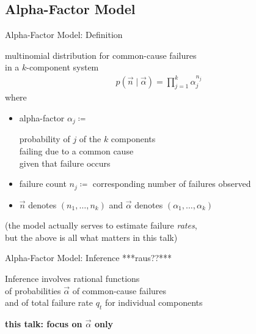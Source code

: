 \documentclass{beamer}
\begin{document}
\subsection{Alpha-Factor Model}

\begin{frame}{Alpha-Factor Model: Definition}
  \begin{definition} %
    multinomial distribution for common-cause failures \\
    in a $k$-component system\vspace*{-2ex}
    \begin{align*}
      p(\vec{n}\mid\vec{\alpha})=\prod_{j=1}^k\alpha_j^{n_j}
    \end{align*}\vspace*{-0.5ex}
    where
    \begin{itemize}
    \item \alert{alpha-factor}
      $\alpha_j\coloneqq$
      \parbox[t]{0.6\textwidth}{%
        probability of $j$ of the $k$ components \\
        failing due to a common cause \\
        given that failure occurs
      }
    \item \alert{failure count}
      $n_j\coloneqq$ corresponding number of failures observed
    \item $\vec{n}$ denotes $(n_1,\dots,n_k)$ and $\vec{\alpha}$ denotes $(\alpha_1,\dots,\alpha_k)$
    \end{itemize}
  \end{definition}
  (the model actually serves to estimate failure \emph{rates},\\ but the above is all what matters in this talk)
\end{frame}

\begin{frame}{Alpha-Factor Model: Inference ***raus??***}
  \begin{block}{Inference}
    involves rational functions \\
    of probabilities $\vec{\alpha}$ of common-cause failures\\
    and of total failure rate $q_t$ for individual components
  \end{block}
  \begin{center}
    \textbf{this talk: focus on $\vec{\alpha}$ only}
  \end{center}
\end{frame}
\end{document}
